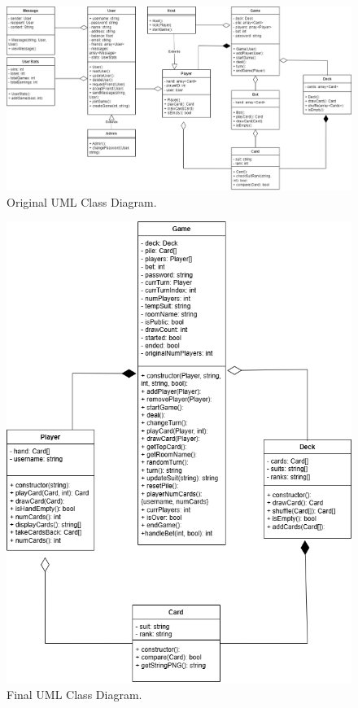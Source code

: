 \documentclass{article}
\begin{document}
\begin{figure}[h]
\centering
\includegraphics[width=\linewidth]{Crazy8sUML.png}
\caption{\label{fig:OldUML}Original UML Class Diagram.}
\end{figure}

\begin{figure}[h]
\centering
\includegraphics[width=\linewidth]{NewUML.png}
\caption{\label{fig:NewUML}Final UML Class Diagram.}
\end{figure}
\end{document}
